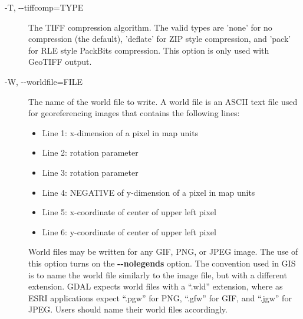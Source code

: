 \begin{description}
\item[-T, -{-}tiffcomp=TYPE]The TIFF compression algorithm. The valid types are 'none' for no compression (the default), 'deflate' for ZIP style compression, and 'pack' for RLE style PackBits compression. This option is only used with GeoTIFF output.
\item[-W, -{-}worldfile=FILE]The name of the world file to write. A world file is an ASCII text file used for georeferencing images that contains the following lines: \begin{itemize}
\item Line 1: x-dimension of a pixel in map units
\item Line 2: rotation parameter
\item Line 3: rotation parameter
\item Line 4: NEGATIVE of y-dimension of a pixel in map units
\item Line 5: x-coordinate of center of upper left pixel
\item Line 6: y-coordinate of center of upper left pixel

\end{itemize}
 World files may be written for any GIF, PNG, or JPEG image. The use of this option turns on the \textbf{-{-}nolegends}
 option. The convention used in GIS is to name the world file similarly to the image file, but with a different extension. GDAL expects world files with a ``.wld'' extension, where as ESRI applications expect ``.pgw'' for PNG, ``.gfw'' for GIF, and ``.jgw'' for JPEG. Users should name their world files accordingly.

\end{description}
